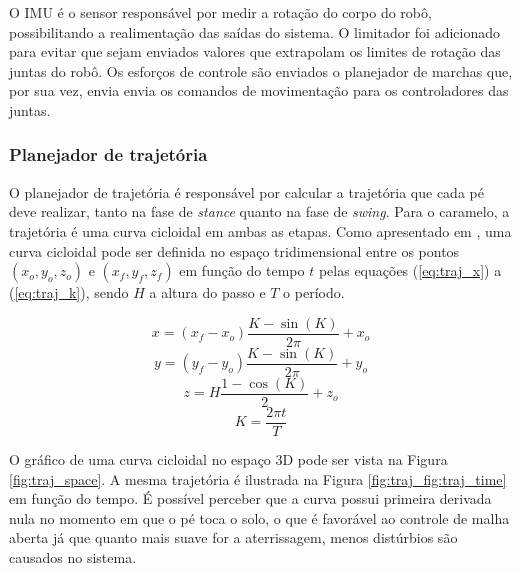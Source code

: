 \documentclass[../main.tex]{subfiles}
\begin{document}
O IMU é o sensor responsável por medir a rotação do corpo do robô, possibilitando a realimentação das saídas do sistema. O limitador foi adicionado para evitar que sejam enviados valores que extrapolam os limites de rotação das juntas do robô. Os esforços de controle são enviados o planejador de marchas que, por sua vez, envia envia os comandos de movimentação para os controladores das juntas.

\subsubsection{Planejador de trajetória}

O planejador de trajetória é responsável por calcular a trajetória que cada pé deve realizar, tanto na fase de \textit{stance} quanto na fase de \textit{swing}. Para o caramelo, a trajetória é uma curva cicloidal em ambas as etapas. Como apresentado em \cite{Shi2021}, uma curva cicloidal pode ser definida no espaço tridimensional entre os pontos $(x_o, y_o, z_o)$ e $(x_f, y_f, z_f)$ em função do tempo $t$ pelas equações (\ref{eq:traj_x}) a (\ref{eq:traj_k}), sendo $H$ a altura do passo e $T$ o período.

\begin{equation}
  x = (x_f - x_o) \frac{K - \sin{(K)}}{2 \pi} + x_o
  \label{eq:traj_x}
\end{equation}
\begin{equation}
  y = (y_f - y_o) \frac{K - \sin{(K)}}{2 \pi} + y_o
  \label{eq:traj_y}
\end{equation}
\begin{equation}
  z = H \frac{1 - \cos{(K)}}{2} + z_o
  \label{eq:traj_z}
\end{equation}
\begin{equation}
  K = \frac{2 \pi t}{T}
  \label{eq:traj_k}
\end{equation}

O gráfico de uma curva cicloidal no espaço 3D pode ser vista na Figura \ref{fig:traj_space}. A mesma trajetória é ilustrada na Figura \ref{fig:traj_fig:traj_time} em função do tempo. É possível perceber que a curva possui primeira derivada nula no momento em que o pé toca o solo, o que é favorável ao controle de malha aberta já que quanto mais suave for a aterrissagem, menos distúrbios são causados no sistema.
\end{document}
